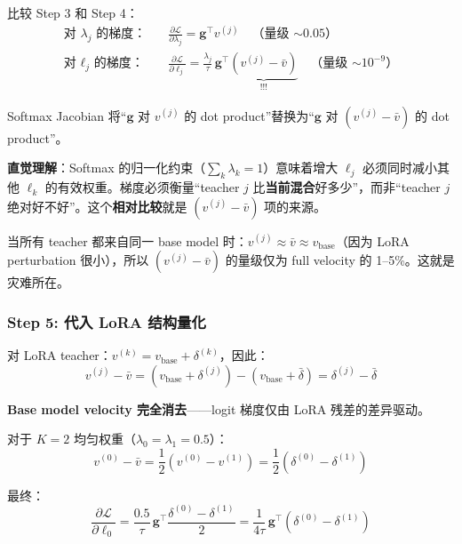 \documentclass[11pt,a4paper]{article}
\newcommand{\loss}{\mathcal{L}}
\theoremstyle{definition}
\begin{document}
\begin{tcolorbox}[colback=red!5, colframe=red!60!black, title=关键发现 2: Softmax 的``均值减除''效应]
比较 Step 3 和 Step 4：
\begin{align}
\text{对 } \lambda_j \text{ 的梯度：} &\quad \frac{\partial \loss}{\partial \lambda_j} = \mathbf{g}^\top v^{(j)} \quad\text{（量级 $\sim 0.05$）} \\
\text{对 } \ell_j \text{ 的梯度：} &\quad \frac{\partial \loss}{\partial \ell_j} = \frac{\lambda_j}{\tau}\,\mathbf{g}^\top\underbrace{\left(v^{(j)} - \bar{v}\right)}_{\text{!!!}} \quad\text{（量级 $\sim 10^{-9}$）}
\end{align}

Softmax Jacobian 将``$\mathbf{g}$ 对 $v^{(j)}$ 的 dot product''替换为``$\mathbf{g}$ 对 $(v^{(j)} - \bar{v})$ 的 dot product''。

\textbf{直觉理解}：Softmax 的归一化约束（$\sum_k \lambda_k = 1$）意味着增大 $\ell_j$ 必须同时减小其他 $\ell_k$ 的有效权重。梯度必须衡量``teacher $j$ 比\textbf{当前混合}好多少''，而非``teacher $j$ 绝对好不好''。这个\textbf{相对比较}就是 $(v^{(j)} - \bar{v})$ 项的来源。

当所有 teacher 都来自同一 base model 时：$v^{(j)} \approx \bar{v} \approx v_{\mathrm{base}}$（因为 LoRA perturbation 很小），所以 $(v^{(j)} - \bar{v})$ 的量级仅为 full velocity 的 1--5\%。这就是灾难所在。
\end{tcolorbox}

\subsubsection{Step 5: 代入 LoRA 结构量化}

对 LoRA teacher：$v^{(k)} = v_{\mathrm{base}} + \delta^{(k)}$，因此：
\begin{equation}
v^{(j)} - \bar{v} = (v_{\mathrm{base}} + \delta^{(j)}) - (v_{\mathrm{base}} + \bar{\delta}) = \delta^{(j)} - \bar{\delta}
\end{equation}

\textbf{Base model velocity 完全消去}——logit 梯度仅由 LoRA 残差的差异驱动。

对于 $K=2$ 均匀权重（$\lambda_0 = \lambda_1 = 0.5$）：
\begin{equation}
v^{(0)} - \bar{v} = \frac{1}{2}(v^{(0)} - v^{(1)}) = \frac{1}{2}(\delta^{(0)} - \delta^{(1)})
\end{equation}

最终：
\begin{equation}
\frac{\partial \loss}{\partial \ell_0} = \frac{0.5}{\tau}\,\mathbf{g}^\top \frac{\delta^{(0)} - \delta^{(1)}}{2} = \frac{1}{4\tau}\,\mathbf{g}^\top(\delta^{(0)} - \delta^{(1)})
\end{equation}
\end{document}
